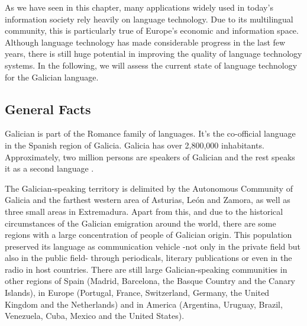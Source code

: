 \begin{multicols}{2}
\begin{itemize}
\begin{multicols}{2}
    As we have seen in this chapter, many applications widely used in today’s information society rely heavily on language technology. Due to its multilingual community, this is particularly true of Europe’s economic and information space. Although language technology has made considerable progress in the last few years, there is still huge potential in improving the quality of language technology systems. In the following, we will assess the current state of language technology for the Galician language.
\end{multicols}

\clearpage


\begin{multicols}{2}

\subsection{General Facts}

    Galician is part of the Romance family of languages. It’s the co-official language in the Spanish region of Galicia. Galicia has over 2,800,000 inhabitants. Approximately, two million persons are speakers of Galician and the rest speaks it as a second language \cite{GAL-Nota5,GAL-Nota6}.




The Galician-speaking territory is delimited by the Autonomous Community of Galicia and the farthest western area of Asturias, León and Zamora, as well as three small areas in Extremadura. Apart from this, and due to the historical circumstances of the Galician emigration around the world, there are some regions with a large concentration of people of Galician origin. This population preserved its language as communication vehicle -not only in the private field but also in the public field- through periodicals, literary publications or even in the radio in host countries. There are still large Galician-speaking communities in other regions of Spain (Madrid, Barcelona, the Basque Country and the Canary Islands), in Europe (Portugal, France, Switzerland, Germany, the United Kingdom and the Netherlands) and in America (Argentina, Uruguay, Brazil, Venezuela, Cuba, Mexico and the United States).
 

\end{multicols}
\end{itemize}
\end{multicols}

